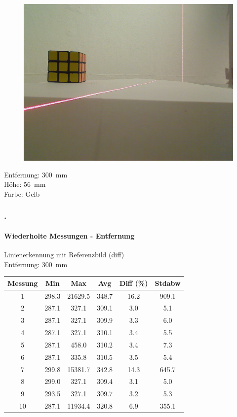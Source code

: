 \documentclass[xcolor=dvipsnames]{beamer}
\def\frametitlesec{\frametitle{\arabic{section}.\hspace{0.5ex}\insertsection}}
\def\framesubtitles#1{\framesubtitle{\hspace{3.5ex}#1}}
\begin{document}
\begin{frame}
\begin{figure}
\begin{minipage}{0.32\linewidth}
		\end{minipage}
		\hfill
		\begin{minipage}{0.32\linewidth}
			\includegraphics[width=\linewidth]{includes/test_repeat_3}
		\end{minipage}
	\end{figure}
	
	Entfernung: 300~mm\\
	Höhe: 56~mm\\
	Farbe: Gelb

\end{frame}


\begin{frame}
	\frametitlesec
	\framesubtitles{Wiederholte Messungen - Entfernung}

	Linienerkennung mit Referenzbild (diff)\\
	Entfernung: 300~mm
	\vfill

	\begin{tabular}{c|c|c|c|c|c}
		Messung & Min & Max & Avg & Diff (\%) & Stdabw \\ \hline
		1 & 298.3 & 21629.5 & 348.7 & 16.2 & 909.1 \\
		2 & 287.1 & 327.1 & 309.1 & 3.0 & 5.1 \\
		3 & 287.1 & 327.1 & 309.9 & 3.3 & 6.0 \\
		4 & 287.1 & 327.1 & 310.1 & 3.4 & 5.5 \\
		5 & 287.1 & 458.0 & 310.2 & 3.4 & 7.3 \\
		6 & 287.1 & 335.8 & 310.5 & 3.5 & 5.4 \\
		7 & 299.8 & 15381.7 & 342.8 & 14.3 & 645.7 \\
		8 & 299.0 & 327.1 & 309.4 & 3.1 & 5.0 \\
		9 & 293.5 & 327.1 & 309.7 & 3.2 & 5.3 \\
		10 & 287.1 & 11934.4 & 320.8 & 6.9 & 355.1
	\end{tabular}

\end{frame}
\end{document}
